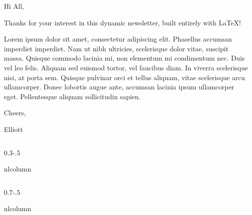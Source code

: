 \begin{page}%
	\Header[%
		title=\inserttitle,
		author=\insertauthor,
		tagline={A procedural \TeX{} newsletter template for professionals},
	]
	
	\Spacer[height=\nlmargin]

	\begin{foreword}[%
		image=img/ep.jpg,
	]%
		Hi All, \newline
		
		Thanks for your interest in this dynamic newsletter, built entirely with \LaTeX{}! \newline
		
		Lorem ipsum dolor sit amet, consectetur adipiscing elit. Phasellus accumsan imperdiet imperdiet. Nam ut nibh ultricies, scelerisque dolor vitae, suscipit massa. Quisque commodo lacinia mi, non elementum mi condimentum nec. Duis vel leo felis. Aliquam sed euismod tortor, vel faucibus diam. In viverra scelerisque nisi, at porta sem. Quisque pulvinar orci et tellus aliquam, vitae scelerisque arcu ullamcorper. Donec lobortis augue ante, accumsan lacinia ipsum ullamcorper eget. Pellentesque aliquam sollicitudin sapien. \newline
		
		Cheers,
		
		Elliott
	\end{foreword}


	\Spacer[height=\nlmargin]

	\newlength{\ColumnsGap}
	\setlength{\ColumnsGap}{\nlmargin}

	\begin{acolumns}[T,totalwidth=\nlwidth]%
		\begin{column}{0.3\nlwidth-.5\ColumnsGap}%
			\begin{beamercolorbox}[sep=0pt]{nlcolumn}%
				\begin{tile}[%
					bg=main-bg,
					fg=white,
					width=.3\nlwidth-.5\ColumnsGap-2cm,
				]%
					\lipsum[1]%
				\end{tile}%
				\autoheight%
			\end{beamercolorbox}%
		\end{column}%
		\begin{column}{0.7\nlwidth-.5\ColumnsGap}%
			\begin{beamercolorbox}[sep=0pt]{nlcolumn}%
				\begin{tile}[%
					bg=main-bg!10,
					fg=main-fg,
					width=.7\nlwidth-.5\ColumnsGap-2cm,
				]%
					\lipsum[1]%
				\end{tile}%
				
			
				\autoheight%
			\end{beamercolorbox}%
		\end{column}%
	\end{acolumns}%
\end{page}